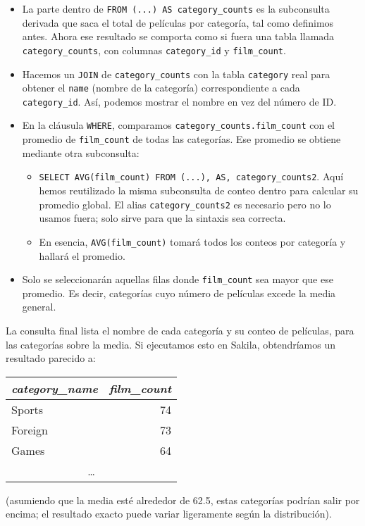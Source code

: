 \documentclass[12pt,a4paper]{article}
\begin{document}
\begin{itemize}
\item La parte dentro de \texttt{FROM (...) AS category\_counts} es la subconsulta derivada que saca el total de películas por categoría, tal como definimos antes.
%
Ahora ese resultado se comporta como si fuera una tabla llamada \texttt{category\_counts}, con columnas \texttt{category\_id} y \texttt{film\_count}.
\item Hacemos un \texttt{JOIN} de \texttt{category\_counts} con la tabla \texttt{category} real para obtener el \texttt{name} (nombre de la categoría) correspondiente a cada \texttt{category\_id}.
%
Así, podemos mostrar el nombre en vez del número de ID.
\item En la cláusula \texttt{WHERE}, comparamos \texttt{category\_counts.film\_count} con el promedio de \texttt{film\_count} de todas las categorías.
%
Ese promedio se obtiene mediante otra subconsulta:
\begin{itemize}
\item \texttt{SELECT AVG(film\_count) FROM (...), AS, category\_counts2}.
%
Aquí hemos reutilizado la misma subconsulta de conteo dentro para calcular su promedio global.
%
El alias \texttt{category\_counts2} es necesario pero no lo usamos fuera; solo sirve para que la sintaxis sea correcta.
\item En esencia, \texttt{AVG(film\_count)} tomará todos los conteos por categoría y hallará el promedio.
\end{itemize}
\item Solo se seleccionarán aquellas filas donde \texttt{film\_count} sea mayor que ese promedio.
%
Es decir, categorías cuyo número de películas excede la media general.
\end{itemize} La consulta final lista el nombre de cada categoría y su conteo de películas, para las categorías sobre la media.
%
Si ejecutamos esto en Sakila, obtendríamos un resultado parecido a: 


\begin{center}
\begin{tabular}{l r}
\textit{category\_name} & \textit{film\_count}  \\ \hline
Sports & 74  \\
Foreign & 73  \\
Games & 64  \\
\multicolumn{2}{c}{\dots}
\end{tabular}
\end{center} 

(asumiendo que la media esté alrededor de 62.5, estas categorías podrían salir por encima; el resultado exacto puede variar ligeramente según la distribución).
\end{document}
